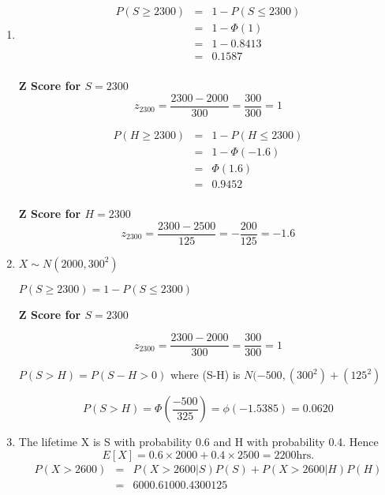 \documentclass[a4paper,12pt]{article}
\begin{document}
\begin{enumerate}
\item    
\begin{multicols}{2}
\begin{eqnarray*}
P( S \geq 2300) &=& 1- P (S \leq 2300)\\
&=& 1-\Phi(1)\\
&=& 1- 0.8413 \\
&=& 0.1587 \\
\end{eqnarray*}
\begin{framed}
\noindent \textbf{Z Score for $S = 2300$}
\[z_{2300}  = \frac{2300 - 2000}{ 300}  = \frac{300}{300} = 1\]
\end{framed}
\begin{eqnarray*}
P( H \geq 2300) &=& 1- P (H \leq 2300)\\
&=& 1-\Phi(-1.6)\\
&=& \Phi(1.6) \\
&=& 0.9452 \\
\end{eqnarray*}
\begin{framed}
\noindent \textbf{Z Score for $H = 2300$}
\[z_{2300}  = \frac{2300 - 2500}{125}  = -\frac{200}{125} = -1.6\]
\end{framed}
\end{multicols}


\item  $X \sim N(2000,300^2)$

$P(S \geq 2300) = 1- P(S \leq 2300)$

\begin{framed}
\noindent \textbf{Z Score for $S = 2300$}

\[z_{2300}  = \frac{2300 - 2000}{ 300}  = \frac{300}{300} = 1\]
\end{framed}

$P(S >H) = P(S-H>0)$ where (S-H)  is $N(-500, (300^2) + (125^2)$

\[P(S >H) = \Phi\left( \frac{-500}{325} \right) = \phi (-1.5385) = 0.0620\]

\item The lifetime X is S with probability 0.6 and H with probability 0.4.
Hence \[E[X ] = 0.6×2000 + 0.4× 2500 = 2200 \mbox{hrs} .\]
\begin{eqnarray*}
P( X > 2600) &=& P(X > 2600 | S)P(S ) + P( X > 2600 | H )P(H )\\
 &=& 600 0.6 100 0.4
300 125\\
\end{eqnarray*}



\end{enumerate}
\end{document}
